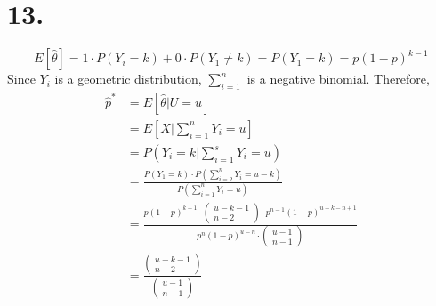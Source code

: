 \documentclass[11pt]{article}
\begin{document}
\section*{13.}
\[
    E[\hat{\theta}] = 1 \cdot P(Y_i = k) + 0 \cdot P(Y_1 \ne k) = P(Y_1 = k) = p(1-p)^{k-1}    
\]
Since $Y_i$ is a geometric distribution, $\sum_{i=1}^n$ is a negative binomial. Therefore, 
\begin{equation*}
    \begin{aligned}
        \hat{p}^* 
        &= E[\hat{\theta} | U = u] \\
        &= E[X | \sum_{i=1}^n Y_i = u] \\
        &= P(Y_i = k | \sum_{i=1}^s Y_i = u) \\
        &= \frac{P(Y_1 = k) \cdot P\left(\sum_{i=2}^n Y_i = u-k \right)}{P\left(\sum_{i=1}^n Y_i = u \right)} \\
        &= \frac
        {p(1-p)^{k-1} 
        \cdot 
        \begin{pmatrix}
            u-k-1  \\
            n-2
        \end{pmatrix}
        \cdot p^{n-1} (1-p)^{u-k-n+1}
        }
        {p^n (1-p)^{u-n}
        \cdot 
        \begin{pmatrix}
            u-1  \\
            n-1
        \end{pmatrix}
        } \\
        &= \frac
        {\begin{pmatrix}
            u-k-1  \\
            n-2
        \end{pmatrix}}
        {\begin{pmatrix}
            u-1  \\
            n-1
        \end{pmatrix}}
    \end{aligned}
\end{equation*}
\end{document}
